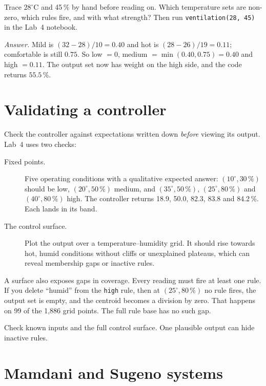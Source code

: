 \begin{tryit}
Trace $28^\circ$C and 45\,\% by hand before reading on. Which temperature sets are non-zero, which rules fire, and with what strength? Then run \texttt{ventilation(28, 45)} in the Lab~4 notebook.

\emph{Answer.} Mild is $(32-28)/10=0.40$ and hot is $(28-26)/19=0.11$; comfortable is still $0.75$. So low $=0$, medium $=\min(0.40,0.75)=0.40$ and high $=0.11$. The output set now has weight on the high side, and the code returns $55.5\,\%$.
\end{tryit}

\section{Validating a controller}

Check the controller against expectations written down \emph{before} viewing its output. Lab~4 uses two checks:

\begin{description}
  \item[Fixed points.] Five operating conditions with a qualitative expected answer: $(10^\circ, 30\,\%)$ should be low, $(20^\circ, 50\,\%)$ medium, and $(35^\circ, 50\,\%)$, $(25^\circ, 80\,\%)$ and $(40^\circ, 80\,\%)$ high. The controller returns 18.9, 50.0, 82.3, 83.8 and 84.2\,\%. Each lands in its band.
  \item[The control surface.] Plot the output over a temperature--humidity grid. It should rise towards hot, humid conditions without cliffs or unexplained plateaus, which can reveal membership gaps or inactive rules.
\end{description}

A surface also exposes gaps in coverage. Every reading must fire at least one rule. If you delete ``humid'' from the \texttt{high} rule, then at $(25^\circ, 80\,\%)$ no rule fires, the output set is empty, and the centroid becomes a division by zero. That happens on 99 of the 1,886 grid points. The full rule base has no such gap.

\begin{keyidea}
Check known inputs and the full control surface. One plausible output can hide inactive rules.
\end{keyidea}

\section{Mamdani and Sugeno systems}

